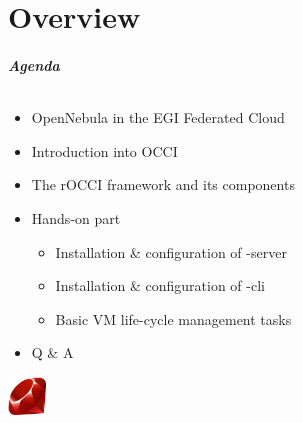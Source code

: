 \part{Overview}

\begin{frame}
  \frametitle{Agenda}
  \framesubtitle{}
  \begin{itemize}
    \item OpenNebula in the EGI Federated Cloud
    \item Introduction into OCCI
    \item The rOCCI framework and its components
    \item Hands-on part
      \begin{itemize}
        \item Installation \& configuration of \rocci-server
        \item Installation \& configuration of \rocci-cli
        \item Basic VM life-cycle management tasks
      \end{itemize}
    \item Q \& A
  \end{itemize}
  \hfill\includegraphics[width=1cm]{images/ruby_logo}
\end{frame}
